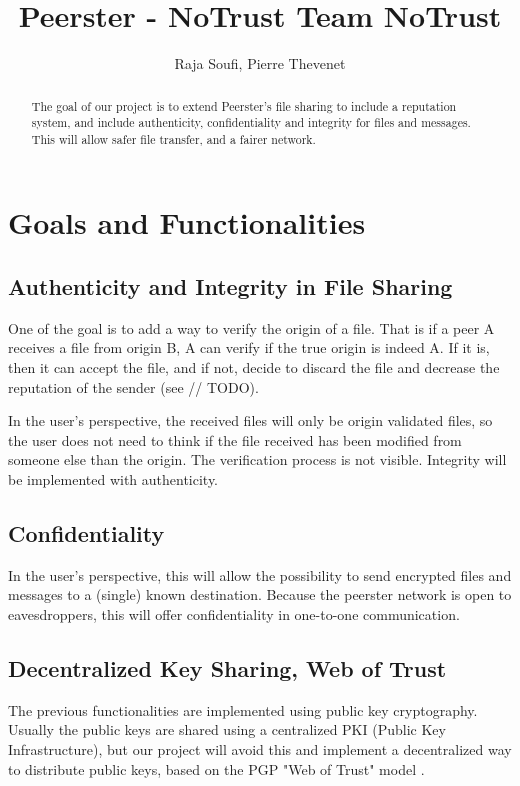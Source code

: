 \documentclass[]{article}
\title{Peerster - NoTrust\newline
Team NoTrust}
\author{Raja Soufi, Pierre Thevenet}
\begin{document}
\maketitle

\begin{abstract}
The goal of our project is to extend Peerster's file sharing to include a reputation system, and include authenticity, confidentiality and integrity for files and messages. This will allow safer file transfer, and a fairer network.
\end{abstract}

\section{Goals and Functionalities}

\subsection{Authenticity and Integrity in File Sharing}
One of the goal is to add a way to verify the origin of a file. That is if a peer A receives a file from origin B, A can verify if the true origin is indeed A. If it is, then it can accept the file, and if not, decide to discard the file and decrease the reputation of the sender (see // TODO). \newline

In the user's perspective, the received files will only be origin validated files, so the user does not need to think if the file received has been modified from someone else than the origin. The verification process is not visible.
Integrity will be implemented with authenticity.

\subsection{Confidentiality}
In the user's perspective, this will allow the possibility to send encrypted files and messages to a (single) known destination. Because the peerster network is open to eavesdroppers, this will offer confidentiality in one-to-one communication.

\subsection{Decentralized Key Sharing, Web of Trust}
The previous functionalities are implemented using public key cryptography. Usually the public keys are shared using a centralized PKI (Public Key Infrastructure), but our project will avoid this and implement a decentralized way to distribute public keys, based on the PGP "Web of Trust" model \cite{abdul1997pgp}.
\end{document}
